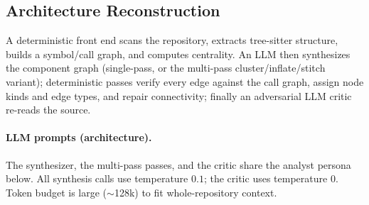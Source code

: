 \documentclass[11pt]{article}
\begin{document}
\subsection{Architecture Reconstruction}
\label{app:impl-arch}

A deterministic front end scans the repository, extracts tree-sitter structure, builds a symbol/call graph, and computes centrality. An LLM then synthesizes the component graph (single-pass, or the multi-pass cluster/inflate/stitch variant); deterministic passes verify every edge against the call graph, assign node kinds and edge types, and repair connectivity; finally an adversarial LLM critic re-reads the source.

\paragraph{LLM prompts (architecture).} The synthesizer, the multi-pass passes, and the critic share the analyst persona below. All synthesis calls use temperature $0.1$; the critic uses temperature $0$. Token budget is large ($\sim$128k) to fit whole-repository context.
\end{document}
